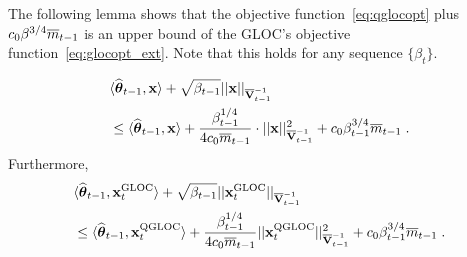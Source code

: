 The following lemma shows that the objective function~\eqref{eq:qglocopt} plus $c_0\beta^{3/4} \overline{m}_{t-1}$ is an upper bound of the GLOC's objective function~\eqref{eq:glocopt_ext}.
Note that this holds for any sequence $\{\beta_t\}$.
\begin{lem}\label{lem:ub}
  \begin{equation*}\begin{aligned}
  &{\langle} \widehat{\boldsymbol\theta}_{t-1}, \mathbf{x} {\rangle} + \sqrt{\beta_{t-1}}||\mathbf{x}||_{\overline{\mathbf{V}}^{-1}_{t-1}} \\
  &\le {\langle} \widehat{\boldsymbol\theta}_{t-1}, \mathbf{x} {\rangle}  + { \frac{\beta_{t-1}^{1/4}}{4 c_0 \overline{m}_{t-1}} } \cdot || \mathbf{x} ||^2_{\overline{\mathbf{V}}^{-1}_{t-1}}  + c_0 \beta_{t-1}^{3/4} \overline{m}_{t-1} \;.
  \end{aligned}\end{equation*}
  Furthermore,
  \emph{
  \begin{equation}\begin{aligned}
    &{\langle} \widehat{\boldsymbol\theta}_{t-1}, \mathbf{x}_{t}^{\text{\normalfont GLOC}} {\rangle} + \sqrt{\beta_{t-1}} ||\mathbf{x}_{t}^{\text{\normalfont GLOC}}||_{\overline{\mathbf{V}}^{-1}_{t-1}} \\
    &\le {\langle} \widehat{\boldsymbol\theta}_{t-1}, \mathbf{x}_{t}^{\text{\normalfont QGLOC}} {\rangle} + { \frac{\beta_{t-1}^{1/4}}{4 c_0 \overline{m}_{t-1}} }  ||\mathbf{x}_{t}^{\text{\normalfont QGLOC}}||^2_{\overline{\mathbf{V}}^{-1}_{t-1}}  + c_0 \beta_{t-1}^{3/4} \overline{m}_{t-1}  \;.
  \end{aligned}\end{equation}
  }
\end{lem}
